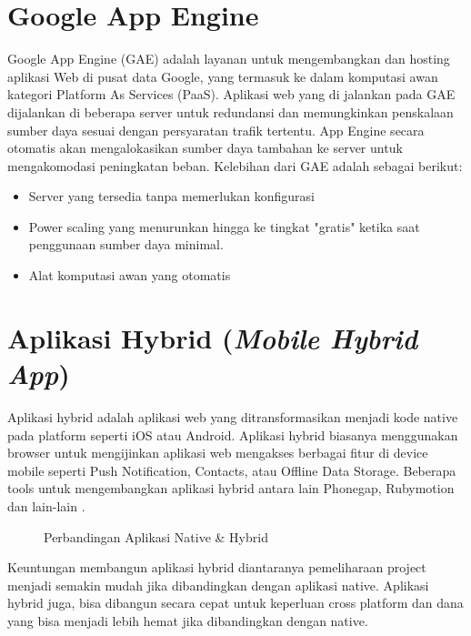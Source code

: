 \section{Google App Engine}
Google App Engine (GAE) adalah layanan untuk mengembangkan dan hosting aplikasi Web di pusat data Google, yang termasuk ke dalam komputasi awan kategori Platform As Services (PaaS). Aplikasi web yang di jalankan pada GAE  dijalankan di beberapa server untuk redundansi dan memungkinkan penskalaan sumber daya sesuai dengan persyaratan trafik tertentu. App Engine secara otomatis akan mengalokasikan sumber daya tambahan ke server untuk mengakomodasi peningkatan beban. Kelebihan dari GAE adalah sebagai berikut: \citep{technopedia}
\begin{itemize}
	\itemsep0em
	\item Server yang tersedia tanpa memerlukan konfigurasi
	\item Power scaling yang menurunkan hingga ke tingkat "gratis" ketika saat penggunaan sumber daya minimal.
	\item Alat komputasi awan yang otomatis
\end{itemize}

\section{Aplikasi Hybrid (\textit{Mobile Hybrid App})}
Aplikasi hybrid adalah aplikasi web yang ditransformasikan menjadi kode native pada platform seperti iOS atau Android. Aplikasi hybrid biasanya menggunakan browser untuk mengijinkan aplikasi web mengakses berbagai fitur di device mobile seperti Push Notification, Contacts, atau Offline Data Storage. Beberapa tools untuk mengembangkan aplikasi hybrid antara lain Phonegap, Rubymotion dan lain-lain \citep{Permana}.
\begin{figure}[H]
	\centering
	\caption{Perbandingan Aplikasi Native \& Hybrid}
	\label{android}
\end{figure}
\par Keuntungan membangun aplikasi hybrid diantaranya pemeliharaan project menjadi semakin mudah jika dibandingkan dengan aplikasi native. Aplikasi hybrid juga, bisa dibangun secara cepat untuk keperluan cross platform dan dana yang bisa menjadi lebih hemat jika dibandingkan dengan native.


